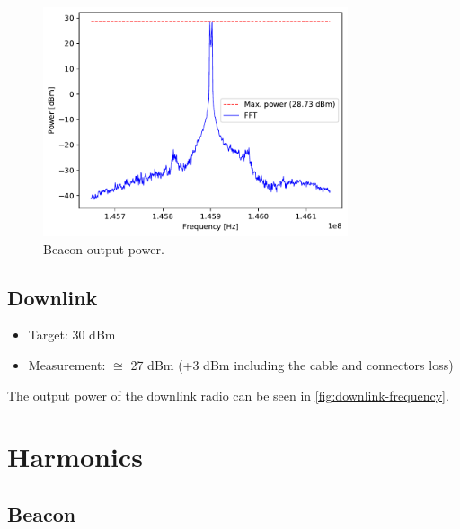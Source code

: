 \documentclass[12pt]{book}
\begin{document}
\begin{figure}[H]
    \begin{center}
        \includegraphics[width=0.8\textwidth]{figures/tests/beacon_output_power.pdf}
        \caption{Beacon output power.}
        \label{fig:beacon-output-power}
    \end{center}
\end{figure}

\subsection{Downlink}

\begin{itemize}
    \item Target: 30 dBm
    \item Measurement: $\cong$ 27 dBm (+3 dBm including the cable and connectors loss)
\end{itemize}

The output power of the downlink radio can be seen in \autoref{fig:downlink-frequency}.

\section{Harmonics}

\subsection{Beacon}
\end{document}
